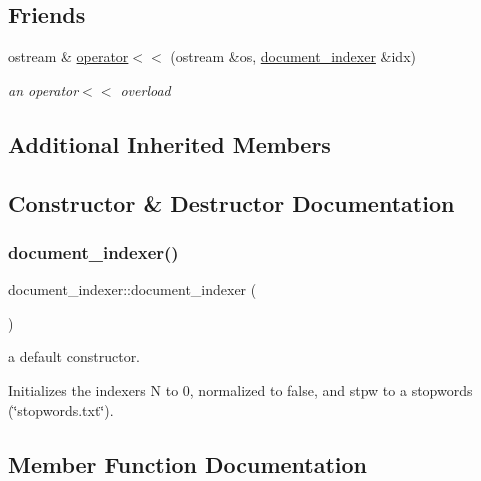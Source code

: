 \subsection*{Friends}
\begin{DoxyCompactItemize}
\item 
ostream \& \hyperlink{classdocument__indexer_aa4cd3fa3dc189d5e7dc4b07ed98958e8}{operator$<$$<$} (ostream \&os, \hyperlink{classdocument__indexer}{document\+\_\+indexer} \&idx)
\begin{DoxyCompactList}\small\item\em an operator$<$$<$ overload \end{DoxyCompactList}\end{DoxyCompactItemize}
\subsection*{Additional Inherited Members}


\subsection{Constructor \& Destructor Documentation}
\mbox{\label{classdocument__indexer_a569b5a1dc381efce6ab2ab64644a7662}} 
\subsubsection{\texorpdfstring{document\+\_\+indexer()}{document\_indexer()}}
{\footnotesize\ttfamily document\+\_\+indexer\+::document\+\_\+indexer (\begin{DoxyParamCaption}{ }\end{DoxyParamCaption})}



a default constructor. 

Initializes the indexer\textquotesingle{}s N to 0, normalized to false, and stpw to a stopwords (\char`\"{}stopwords.\+txt\char`\"{}). 

\subsection{Member Function Documentation}
\mbox{\label{classdocument__indexer_a885c965f69ed1fcef8b4670d48182045}} 
